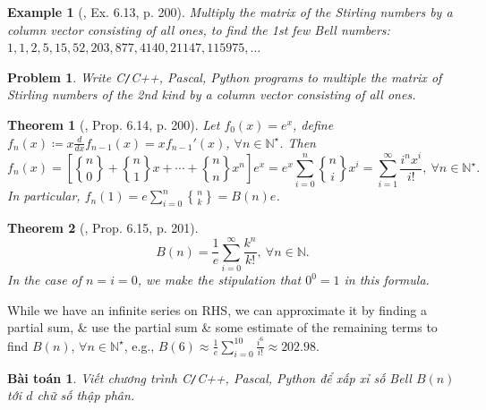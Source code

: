 \documentclass[oneside]{book}
\newtheorem{baitoan}{Bài toán}
\newtheorem{example}{Example}
\newtheorem{problem}{Problem}
\newtheorem{theorem}{Theorem}
\newcommand{\genstirlingII}[3]{%
	\genfrac{\{}{\}}{0pt}{#1}{#2}{#3}%
}
\newcommand{\stirlingII}[2]{\genstirlingII{}{#1}{#2}}
\begin{document}
\begin{example}[\cite{Shahriari2022}, Ex. 6.13, p. 200]
	Multiply the matrix of the Stirling numbers by a column vector consisting of all ones, to find the 1st few Bell numbers: $1,1,2,5,15,52,203,877,4140,21147,115975,\ldots$
\end{example}

\begin{problem}
	Write {\sf C{\tt/}C++, Pascal, Python} programs to multiple the matrix of Stirling numbers of the 2nd kind by a column vector consisting of all ones.
\end{problem}

\begin{theorem}[\cite{Shahriari2022}, Prop. 6.14, p. 200]
	Let $f_0(x) = e^x$, define $f_n(x)\coloneqq x\frac{d}{dx}f_{n-1}(x) = xf_{n-1}'(x)$, $\forall n\in\mathbb{N}^\star$. Then
	\begin{equation*}
		f_n(x) = \left[\stirlingII{n}{0} + \stirlingII{n}{1}x + \cdots + \stirlingII{n}{n}x^n\right]e^x = e^x\sum_{i=0}^n \stirlingII{n}{i}x^i = \sum_{i=1}^\infty \frac{i^nx^i}{i!},\ \forall n\in\mathbb{N}^\star.
	\end{equation*}
	In particular, $f_n(1) = e\sum_{i=0}^n \stirlingII{n}{k} = B(n)e$.
\end{theorem}

\begin{theorem}[\cite{Shahriari2022}, Prop. 6.15, p. 201]
	\begin{equation}
		\label{Bell number: series}
		B(n) = \frac{1}{e}\sum_{i=0}^\infty \frac{k^n}{k!},\ \forall n\in\mathbb{N}.
	\end{equation}
	In the case of $n = i = 0$, we make the stipulation that $0^0 = 1$ in this formula.
\end{theorem}
While we have an infinite series on RHS, we can approximate it by finding a partial sum, \& use the partial sum \& some estimate of the remaining terms to find $B(n)$, $\forall n\in\mathbb{N}^\star$, e.g., $B(6)\approx\frac{1}{e}\sum_{i=0}^{10} \frac{i^6}{i!}\approx202.98$.

\begin{baitoan}
	Viết chương trình {\sf C{\tt/}C++, Pascal, Python} để xấp xỉ số Bell $B(n)$ tới $d$ chữ số thập phân.
\end{baitoan}
\end{document}
